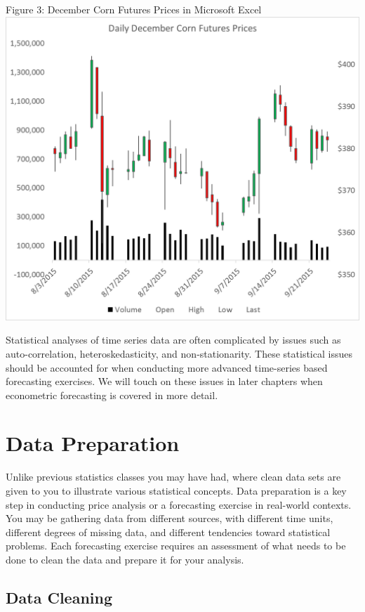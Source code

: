 \documentclass[]{book}
\theoremstyle{definition}
\theoremstyle{definition}
\theoremstyle{remark}
\begin{document}
Figure 3: December Corn Futures Prices in Microsoft Excel
\includegraphics{Excel-files/EconomicDataand-CMECZ2015-candlesticks_files/image001.png}

Statistical analyses of time series data are often complicated by issues
such as auto-correlation, heteroskedasticity, and non-stationarity.
These statistical issues should be accounted for when conducting more
advanced time-series based forecasting exercises. We will touch on these
issues in later chapters when econometric forecasting is covered in more
detail.

\section{Data Preparation}\label{data-preparation}

Unlike previous statistics classes you may have had, where clean data
sets are given to you to illustrate various statistical concepts. Data
preparation is a key step in conducting price analysis or a forecasting
exercise in real-world contexts. You may be gathering data from
different sources, with different time units, different degrees of
missing data, and different tendencies toward statistical problems. Each
forecasting exercise requires an assessment of what needs to be done to
clean the data and prepare it for your analysis.

\subsection{Data Cleaning}\label{data-cleaning}
\end{document}
